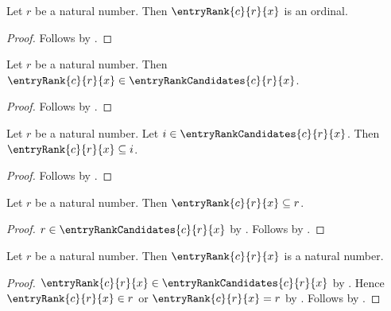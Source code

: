 \begin{proposition}\label{entry_rank_is_ordinal}
    Let $r$ be a natural number.
    Then $\entryRank{c}{r}{x}$ is an ordinal.
\end{proposition}
\begin{proof}
    Follows by
        .
\end{proof}

\begin{proposition}\label{entry_rank_is_candidate}
    Let $r$ be a natural number.
    Then $\entryRank{c}{r}{x}\in\entryRankCandidates{c}{r}{x}$.
\end{proposition}
\begin{proof}
    Follows by
        .
\end{proof}

\begin{proposition}\label{entry_rank_subseteq}
    Let $r$ be a natural number.
    Let $i\in\entryRankCandidates{c}{r}{x}$.
    Then $\entryRank{c}{r}{x}\subseteq i$.
\end{proposition}
\begin{proof}
    Follows by
        .
\end{proof}

\begin{proposition}\label{entry_rank_subseteq_sentinel}
    Let $r$ be a natural number.
    Then $\entryRank{c}{r}{x}\subseteq r$.
\end{proposition}
\begin{proof}
    $r\in\entryRankCandidates{c}{r}{x}$
        by .
    Follows by .
\end{proof}

\begin{proposition}\label{entry_rank_is_natural}
    Let $r$ be a natural number.
    Then $\entryRank{c}{r}{x}$ is a natural number.
\end{proposition}
\begin{proof}
    $\entryRank{c}{r}{x}\in\entryRankCandidates{c}{r}{x}$
        by .
    Hence $\entryRank{c}{r}{x}\in r$ or
        $\entryRank{c}{r}{x}=r$
        by .
    Follows by
        .
\end{proof}

